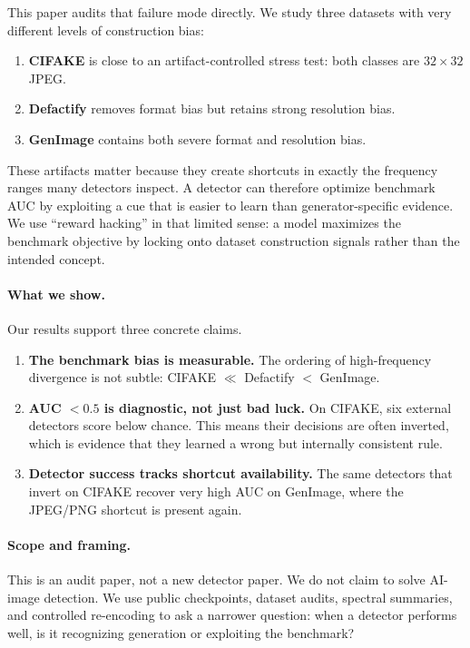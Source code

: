 \documentclass{article}
\begin{document}
This paper audits that failure mode directly. We study three datasets with very different levels of construction bias:
\begin{enumerate}[itemsep=2pt,topsep=2pt]
  \item \textbf{CIFAKE} is close to an artifact-controlled stress test: both classes are $32\times32$ JPEG.
  \item \textbf{Defactify} removes format bias but retains strong resolution bias.
  \item \textbf{GenImage} contains both severe format and resolution bias.
\end{enumerate}
These artifacts matter because they create shortcuts in exactly the frequency ranges many detectors inspect.
A detector can therefore optimize benchmark AUC by exploiting a cue that is easier to learn than generator-specific evidence.
We use ``reward hacking'' in that limited sense: a model maximizes the benchmark objective by locking onto dataset construction signals rather than the intended concept.

\paragraph{What we show.}
Our results support three concrete claims.
\begin{enumerate}[itemsep=2pt,topsep=2pt]
  \item \textbf{The benchmark bias is measurable.} The ordering of high-frequency divergence is not subtle: CIFAKE $\ll$ Defactify $<$ GenImage.
  \item \textbf{AUC $< 0.5$ is diagnostic, not just bad luck.} On CIFAKE, six external detectors score below chance. This means their decisions are often inverted, which is evidence that they learned a wrong but internally consistent rule.
  \item \textbf{Detector success tracks shortcut availability.} The same detectors that invert on CIFAKE recover very high AUC on GenImage, where the JPEG/PNG shortcut is present again.
\end{enumerate}

\paragraph{Scope and framing.}
This is an audit paper, not a new detector paper. We do not claim to solve AI-image detection. We use public checkpoints, dataset audits, spectral summaries, and controlled re-encoding to ask a narrower question: when a detector performs well, is it recognizing generation or exploiting the benchmark?
\end{document}
